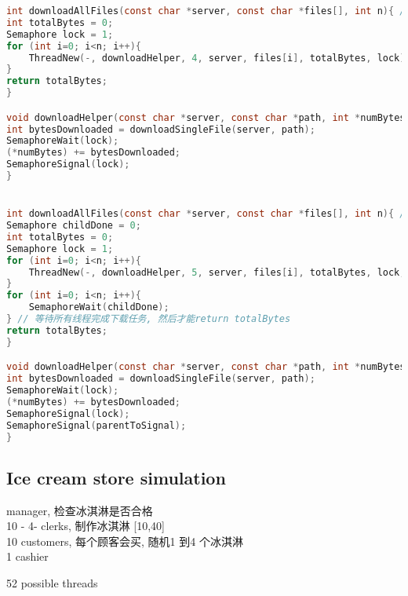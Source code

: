 \documentclass{article}
\begin{document}
\begin{lstlisting}[language = C]
int downloadAllFiles(const char *server, const char *files[], int n){ // n files
int totalBytes = 0;
Semaphore lock = 1;
for (int i=0; i<n; i++){
	ThreadNew(-, downloadHelper, 4, server, files[i], totalBytes, lock);
}
return totalBytes;
}

void downloadHelper(const char *server, const char *path, int *numBytes, Semaphore lock){
int bytesDownloaded = downloadSingleFile(server, path);
SemaphoreWait(lock);
(*numBytes) += bytesDownloaded;
SemaphoreSignal(lock);
}


int downloadAllFiles(const char *server, const char *files[], int n){ // n files
Semaphore childDone = 0;
int totalBytes = 0;
Semaphore lock = 1;
for (int i=0; i<n; i++){
	ThreadNew(-, downloadHelper, 5, server, files[i], totalBytes, lock, childDone);
}
for (int i=0; i<n; i++){
	SemaphoreWait(childDone);
} // 等待所有线程完成下载任务, 然后才能return totalBytes
return totalBytes;
}

void downloadHelper(const char *server, const char *path, int *numBytes, Semaphore lock, Semaphore parentToSignal){
int bytesDownloaded = downloadSingleFile(server, path);
SemaphoreWait(lock);
(*numBytes) += bytesDownloaded;
SemaphoreSignal(lock);
SemaphoreSignal(parentToSignal);
}
\end{lstlisting}

\subsection{Ice cream store simulation}
manager, 检查冰淇淋是否合格\\
10 - 4- clerks, 制作冰淇淋  [10,40]\\
10 customers, 每个顾客会买, 随机1 到4 个冰淇淋\\
1 cashier

52 possible threads
\end{document}
